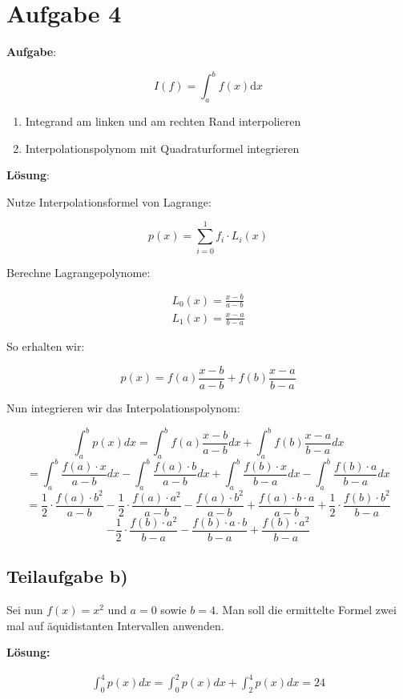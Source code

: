 \section*{Aufgabe 4}
\textbf{Aufgabe}: 

\[I(f) = \int_a^b f(x) \mathrm{d}x \]

\begin{enumerate}
    \item Integrand am linken und am rechten Rand interpolieren
	\item Interpolationspolynom mit Quadraturformel integrieren
\end{enumerate}

\textbf{Lösung}:

Nutze Interpolationsformel von Lagrange:

\[p(x) = \sum_{i=0}^{1} f_i \cdot L_i(x)\]

Berechne Lagrangepolynome:

\begin{align}
    L_0(x) = \frac{x-b}{a-b} \\
    L_1(x) = \frac{x-a}{b-a}
\end{align}

So erhalten wir:

\[p(x) = f(a) \frac{x-b}{a-b} + f(b) \frac{x-a}{b-a}\]

Nun integrieren wir das Interpolationspolynom:

\[ \int_a^b p(x)dx = \int_a^b f(a) \frac{x-b}{a-b}dx + \int_a^b f(b) \frac{x-a}{b-a}dx \]
\[ = \int_a^b \frac{f(a) \cdot x}{a-b}dx - \int_a^b \frac{f(a) \cdot b}{a-b}dx + \int_a^b \frac{f(b) \cdot x}{b-a}dx - \int_a^b \frac{f(b) \cdot a}{b-a}dx \]
\[ = \frac{1}{2} \cdot \frac{f(a) \cdot b^2}{a-b} - \frac{1}{2} \cdot \frac{f(a) \cdot a^2}{a-b} - \frac{f(a) \cdot b^2}{a-b} + \frac{f(a) \cdot b \cdot a}{a-b} + \frac{1}{2} \cdot \frac{f(b) \cdot b^2}{b-a} \]
\[ - \frac{1}{2} \cdot \frac{f(b) \cdot a^2}{b-a} - \frac{f(b) \cdot a \cdot b}{b-a} + \frac{f(b) \cdot a^2}{b-a}\]

\subsection*{Teilaufgabe b)}
Sei nun $f(x) = x^2$ und $a = 0$ sowie $b = 4$. Man soll die ermittelte
Formel zwei mal auf äquidistanten Intervallen anwenden.

\textbf{Lösung:}

\begin{align}
	\int_0^4 p(x) dx = \int_0^2 p(x)dx + \int_2^4 p(x)dx = 24
\end{align}

